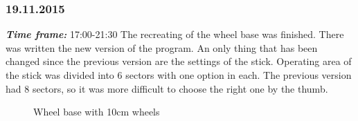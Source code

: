 \subsubsection{19.11.2015}
\textit{\textbf{Time frame:}} 17:00-21:30 \newline
The recreating of the wheel base was finished. There was written the new version of the program. An only thing that has been changed since the previous version are the settings of the stick. Operating area of the stick was divided into 6 sectors with one option in each. The previous version had 8 sectors, so it was more difficult to choose the right one by the thumb.

\begin{figure}[H]
	\begin{minipage}[h]{1\linewidth}
		\caption{Wheel base with 10cm wheels}
		\label{wheeel_base_10cm_wheels}
	\end{minipage}
\end{figure}

